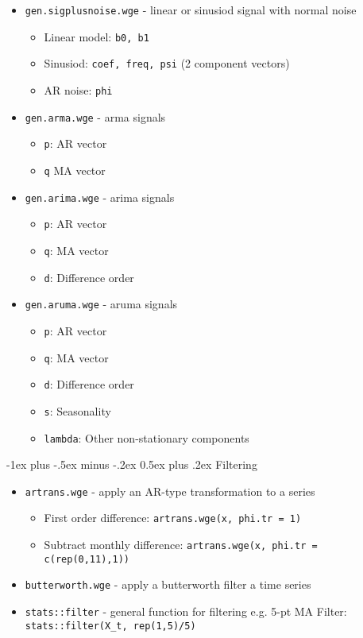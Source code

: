 \documentclass[a4paper]{article}
\makeatletter
\renewcommand{\section}{\@startsection{section}{1}{0mm}%
	{-1ex plus -.5ex minus -.2ex}%
	{0.5ex plus .2ex}%
	{\normalfont\large\bfseries}}
\makeatother
\begin{document}
\begin{multicols}{3}
		\begin{itemize}
			\item \texttt{gen.sigplusnoise.wge} - linear or sinusiod signal with normal noise
			\begin{itemize}
				\item Linear model: \texttt{b0, b1}
				\item Sinusiod: \texttt{coef, freq, psi} (2 component vectors)
				\item AR noise: \texttt{phi}
			\end{itemize}
			\item \texttt{gen.arma.wge} - arma signals
				\begin{itemize}
					\item \texttt{p}: AR vector
					\item \texttt{q} MA vector
				\end{itemize}
			\item \texttt{gen.arima.wge} - arima signals
				\begin{itemize}
					\item \texttt{p}: AR vector
					\item \texttt{q}: MA vector
					\item \texttt{d}: Difference order
				\end{itemize}
			\item \texttt{gen.aruma.wge} - aruma signals
				\begin{itemize}
					\item \texttt{p}: AR vector
					\item \texttt{q}: MA vector
					\item \texttt{d}: Difference order
					\item \texttt{s}: Seasonality
					\item \texttt{lambda}: Other non-stationary components
				\end{itemize}
		\end{itemize}
		
		\section{Filtering}
		
		\begin{itemize}
			\item \texttt{artrans.wge} - apply an AR-type transformation to a series
			\begin{itemize}
				\item First order difference: \texttt{artrans.wge(x, phi.tr = 1)}
				\item Subtract monthly difference: \texttt{artrans.wge(x, phi.tr = c(rep(0,11),1))}
			\end{itemize}
			\item \texttt{butterworth.wge} - apply a butterworth filter a time series
			\item \texttt{stats::filter} - general function for filtering e.g.
			5-pt MA Filter: \texttt{stats::filter(X\_t, rep(1,5)/5)}
		\end{itemize}
		
	\end{multicols}
	
\end{document}
